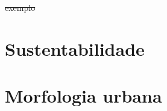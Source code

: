 \documentclass[]{report}
\begin{document}
			\sout{exemplo}

	\section{Sustentabilidade}


\section{Morfologia urbana}

\end{document}
